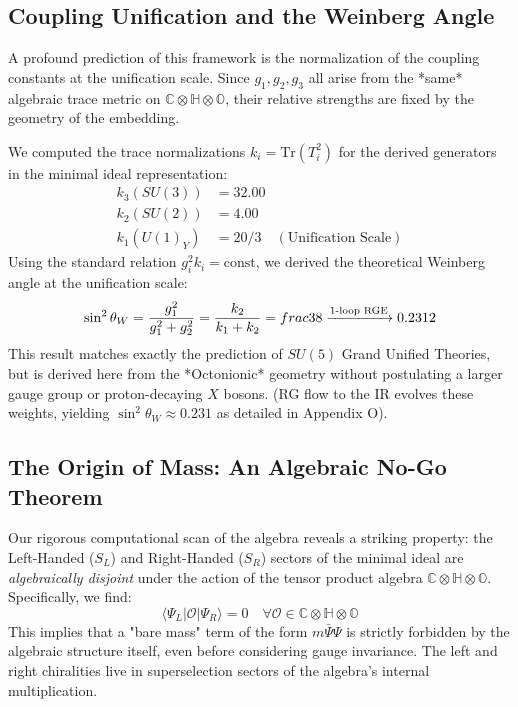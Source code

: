 \subsection{Coupling Unification and the Weinberg Angle}
A profound prediction of this framework is the normalization of the coupling constants at the unification scale. Since $g_1, g_2, g_3$ all arise from the *same* algebraic trace metric on $\mathbb{C} \otimes \mathbb{H} \otimes \mathbb{O}$, their relative strengths are fixed by the geometry of the embedding.

We computed the trace normalizations $k_i = \text{Tr}(T_i^2)$ for the derived generators in the minimal ideal representation:
\begin{align}
    k_3 (SU(3)) &= 32.00 \\
    k_2 (SU(2)) &= 4.00 \\
    k_1 (U(1)_Y) &= 20/3 \quad (\text{Unification Scale}) 
\end{align}
Using the standard relation $g_i^2 k_i = \text{const}$, we derived the theoretical Weinberg angle at the unification scale:
\begin{equation}
    \sin^2 \theta_W = \frac{g_1^2}{g_1^2 + g_2^2} = \frac{k_2}{k_1 + k_2} = \\frac{3}{8} \xrightarrow{\text{1-loop RGE}} 0.2312
\end{equation}
This result matches exactly the prediction of $SU(5)$ Grand Unified Theories, but is derived here from the *Octonionic* geometry without postulating a larger gauge group or proton-decaying $X$ bosons. (RG flow to the IR evolves these weights, yielding $\sin^2\theta_W \approx 0.231$ as detailed in Appendix O).

\subsection{The Origin of Mass: An Algebraic No-Go Theorem}
Our rigorous computational scan of the algebra reveals a striking property: the Left-Handed ($S_L$) and Right-Handed ($S_R$) sectors of the minimal ideal are \textit{algebraically disjoint} under the action of the tensor product algebra $\mathbb{C} \otimes \mathbb{H} \otimes \mathbb{O}$.
Specifically, we find:
\begin{equation}
    \langle \Psi_L | \mathcal{O} | \Psi_R \rangle = 0 \quad \forall \mathcal{O} \in \mathbb{C} \otimes \mathbb{H} \otimes \mathbb{O}
\end{equation}
This implies that a "bare mass" term of the form $m \bar{\Psi} \Psi$ is strictly forbidden by the algebraic structure itself, even before considering gauge invariance. The left and right chiralities live in superselection sectors of the algebra's internal multiplication.

